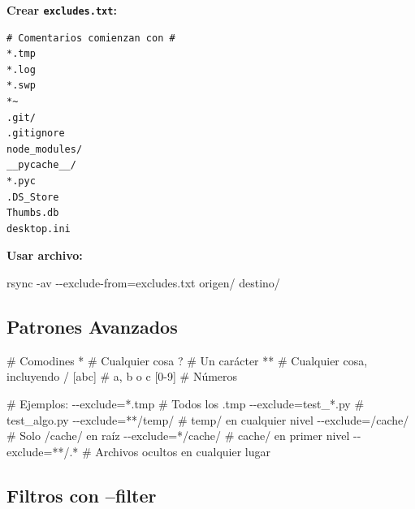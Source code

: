 \documentclass[
  doc,
  floatsintext,
  longtable,
  a4paper,
  nolmodern,
  notxfonts,
  notimes,
  12pt,
  colorlinks=true,linkcolor=blue,citecolor=blue,urlcolor=blue]{apa7}
\newenvironment{Shaded}{\begin{snugshade}}{\end{snugshade}}
\newcommand{\AttributeTok}[1]{\textcolor[rgb]{0.40,0.45,0.13}{#1}}
\newcommand{\CommentTok}[1]{\textcolor[rgb]{0.37,0.37,0.37}{#1}}
\newcommand{\ExtensionTok}[1]{\textcolor[rgb]{0.00,0.23,0.31}{#1}}
\newcommand{\FunctionTok}[1]{\textcolor[rgb]{0.28,0.35,0.67}{#1}}
\newcommand{\NormalTok}[1]{\textcolor[rgb]{0.00,0.23,0.31}{#1}}
\newcommand{\OperatorTok}[1]{\textcolor[rgb]{0.37,0.37,0.37}{#1}}
\newcommand{\StringTok}[1]{\textcolor[rgb]{0.13,0.47,0.30}{#1}}
\begin{document}
\textbf{Crear \texttt{excludes.txt}:}

\begin{verbatim}
# Comentarios comienzan con #
*.tmp
*.log
*.swp
*~
.git/
.gitignore
node_modules/
__pycache__/
*.pyc
.DS_Store
Thumbs.db
desktop.ini
\end{verbatim}

\textbf{Usar archivo:}

\begin{Shaded}
\begin{Highlighting}[]
\FunctionTok{rsync} \AttributeTok{{-}av} \AttributeTok{{-}{-}exclude{-}from}\OperatorTok{=}\NormalTok{excludes.txt origen/ destino/}
\end{Highlighting}
\end{Shaded}

\subsection{Patrones Avanzados}\label{patrones-avanzados}

\begin{Shaded}
\begin{Highlighting}[]
\CommentTok{\# Comodines}
\ExtensionTok{*}        \CommentTok{\# Cualquier cosa}
\ExtensionTok{?}        \CommentTok{\# Un carácter}
\ExtensionTok{**}       \CommentTok{\# Cualquier cosa, incluyendo /}
\ExtensionTok{[abc]}    \CommentTok{\# a, b o c}
\ExtensionTok{[0{-}9]}    \CommentTok{\# Números}

\CommentTok{\# Ejemplos:}
\ExtensionTok{{-}{-}exclude=}\StringTok{\textquotesingle{}*.tmp\textquotesingle{}}              \CommentTok{\# Todos los .tmp}
\ExtensionTok{{-}{-}exclude=}\StringTok{\textquotesingle{}test\_*.py\textquotesingle{}}          \CommentTok{\# test\_algo.py}
\ExtensionTok{{-}{-}exclude=}\StringTok{\textquotesingle{}**/temp/\textquotesingle{}}           \CommentTok{\# temp/ en cualquier nivel}
\ExtensionTok{{-}{-}exclude=}\StringTok{\textquotesingle{}/cache/\textquotesingle{}}            \CommentTok{\# Solo /cache/ en raíz}
\ExtensionTok{{-}{-}exclude=}\StringTok{\textquotesingle{}*/cache/\textquotesingle{}}           \CommentTok{\# cache/ en primer nivel}
\ExtensionTok{{-}{-}exclude=}\StringTok{\textquotesingle{}**/.*\textquotesingle{}}              \CommentTok{\# Archivos ocultos en cualquier lugar}
\end{Highlighting}
\end{Shaded}

\subsection{Filtros con --filter}\label{filtros-con-filter}
\end{document}

